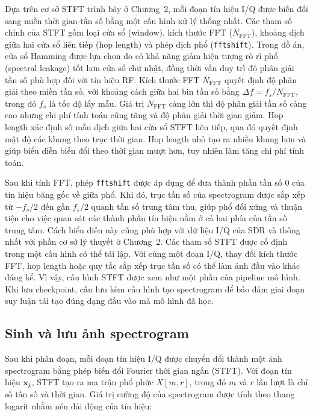 \documentclass[../DoAn.tex]{subfiles}
\begin{document}
Dựa trên cơ sở STFT trình bày ở Chương~2, mỗi đoạn tín hiệu I/Q được biến đổi sang miền thời gian-tần số bằng một cấu hình xử lý thống nhất. Các tham số chính của STFT gồm loại cửa sổ (window), kích thước FFT ($N_{\mathrm{FFT}}$), khoảng dịch giữa hai cửa sổ liên tiếp (hop length) và phép dịch phổ (\texttt{fftshift}). Trong đồ án, cửa sổ Hamming được lựa chọn do có khả năng giảm hiện tượng rò rỉ phổ (spectral leakage) tốt hơn cửa sổ chữ nhật, đồng thời vẫn duy trì độ phân giải tần số phù hợp đối với tín hiệu RF. Kích thước FFT $N_{\mathrm{FFT}}$ quyết định độ phân giải theo miền tần số, với khoảng cách giữa hai bin tần số bằng $\Delta f=f_s/N_{\mathrm{FFT}}$, trong đó $f_s$ là tốc độ lấy mẫu. Giá trị $N_{\mathrm{FFT}}$ càng lớn thì độ phân giải tần số càng cao nhưng chi phí tính toán cũng tăng và độ phân giải thời gian giảm. Hop length xác định số mẫu dịch giữa hai cửa sổ STFT liên tiếp, qua đó quyết định mật độ các khung theo trục thời gian. Hop length nhỏ tạo ra nhiều khung hơn và giúp biểu diễn biến đổi theo thời gian mượt hơn, tuy nhiên làm tăng chi phí tính toán.

Sau khi tính FFT, phép \texttt{fftshift} được áp dụng để đưa thành phần tần số $0$ của tín hiệu băng gốc về giữa phổ. Khi đó, trục tần số của spectrogram được sắp xếp từ $-f_s/2$ đến gần $f_s/2$ quanh tần số trung tâm thu, giúp phổ đối xứng và thuận tiện cho việc quan sát các thành phần tín hiệu nằm ở cả hai phía của tần số trung tâm. Cách biểu diễn này cũng phù hợp với dữ liệu I/Q của SDR và thống nhất với phần cơ sở lý thuyết ở Chương~2. Các tham số STFT được cố định trong một cấu hình có thể tái lập. Với cùng một đoạn I/Q, thay đổi kích thước FFT, hop length hoặc quy tắc sắp xếp trục tần số có thể làm ảnh đầu vào khác đáng kể. Vì vậy, cấu hình STFT được xem như một phần của pipeline mô hình. Khi lưu checkpoint, cần lưu kèm cấu hình tạo spectrogram để bảo đảm giai đoạn suy luận tái tạo đúng dạng đầu vào mà mô hình đã học.

\subsection{Sinh và lưu ảnh spectrogram}

Sau khi phân đoạn, mỗi đoạn tín hiệu I/Q được chuyển đổi thành một ảnh spectrogram bằng phép biến đổi Fourier thời gian ngắn (STFT). Với đoạn tín hiệu $\mathbf{x}_k$, STFT tạo ra ma trận phổ phức $X[m,r]$, trong đó $m$ và $r$ lần lượt là chỉ số tần số và thời gian. Giá trị cường độ của spectrogram được tính theo thang logarit nhằm nén dải động của tín hiệu:
\end{document}
